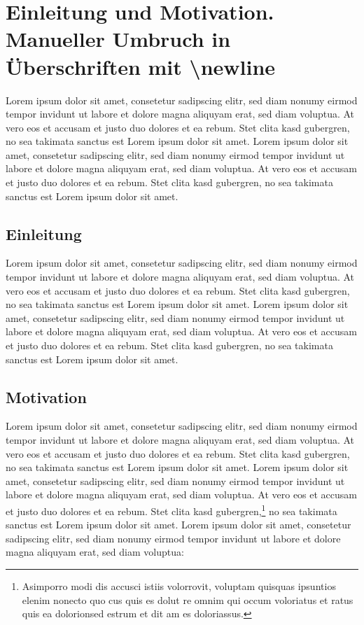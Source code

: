 
\chapter[Einleitung und Motivation]{Einleitung und Motivation. Manueller Umbruch in Überschriften mit \glqq \textbackslash newline\grqq{}}
\label{cha:Einleitung und Motivation}
Lorem ipsum dolor sit amet, consetetur sadipscing elitr, sed diam nonumy eirmod tempor invidunt ut labore et dolore magna aliquyam erat, sed diam voluptua. At vero eos et accusam et justo duo dolores et ea rebum. Stet clita kasd gubergren, no sea takimata sanctus est Lorem ipsum dolor sit amet. Lorem ipsum dolor sit amet, consetetur sadipscing elitr, sed diam nonumy eirmod tempor invidunt ut labore et dolore magna aliquyam erat, sed diam voluptua. At vero eos et accusam et justo duo dolores et ea rebum. Stet clita kasd gubergren, no sea takimata sanctus est Lorem ipsum dolor sit amet.

\section{Einleitung}
\label{sec:Einleitung}
Lorem ipsum dolor sit amet, consetetur sadipscing elitr, sed diam nonumy eirmod tempor invidunt ut labore et dolore magna aliquyam erat, sed diam voluptua. At vero eos et accusam et justo duo dolores et ea rebum. Stet clita kasd gubergren, no sea takimata sanctus est Lorem ipsum dolor sit amet. Lorem ipsum dolor sit amet, consetetur sadipscing elitr, sed diam nonumy eirmod tempor invidunt ut labore et dolore magna aliquyam erat, sed diam voluptua. At vero eos et accusam et justo duo dolores et ea rebum. Stet clita kasd gubergren, no sea takimata sanctus est Lorem ipsum dolor sit amet.

\section{Motivation}
\label{sec:Motivation}
Lorem ipsum dolor sit amet, consetetur sadipscing elitr, sed diam nonumy eirmod tempor invidunt ut labore et dolore magna aliquyam erat, sed diam voluptua. At vero eos et accusam et justo duo dolores et ea rebum. Stet clita kasd gubergren, no sea takimata sanctus est Lorem ipsum dolor sit amet. Lorem ipsum dolor sit amet, consetetur sadipscing elitr, sed diam nonumy eirmod tempor invidunt ut labore et dolore magna aliquyam erat, sed diam voluptua. At vero eos et accusam et justo duo dolores et ea rebum. Stet clita kasd gubergren,\footnote{Asimporro modi dis accusci istiis volorrovit, voluptam quisquas ipsuntios elenim nonecto quo cus quis es dolut re omnim qui occum voloriatus et ratus quis ea dolorionsed estrum et dit am es doloriassus.} no sea takimata sanctus est Lorem ipsum dolor sit amet. Lorem ipsum dolor sit amet, consetetur sadipscing elitr, sed diam nonumy eirmod tempor invidunt ut labore et dolore magna aliquyam erat, sed diam voluptua:

